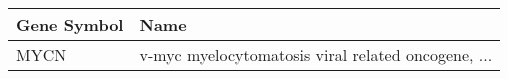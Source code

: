 \begin{tabular}{ll}
\toprule
Gene Symbol &                                               Name \\
\midrule
       MYCN & v-myc myelocytomatosis viral related oncogene, ... \\
\bottomrule
\end{tabular}
